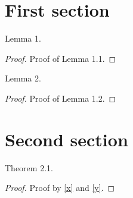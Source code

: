 \section{First section}

\begin{lem}
	\label{x}
	Lemma 1.
\end{lem}
\begin{proof}
	Proof of Lemma 1.1.
\end{proof}

\begin{lem}
	\label{y}
	Lemma 2.
\end{lem}
\begin{proof}
	Proof of Lemma 1.2.
\end{proof}

\section{Second section}

\begin{thm}
	Theorem 2.1.
\end{thm}

\begin{proof}
	Proof by \ref{x} and \ref{y}.
\end{proof}
